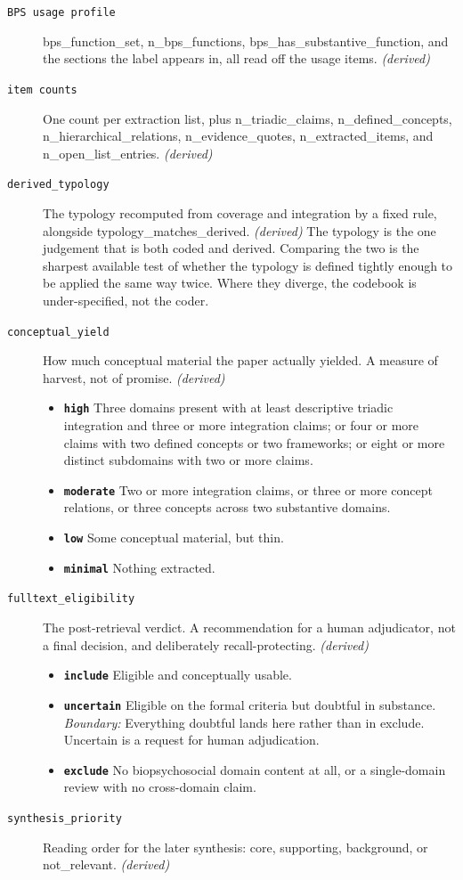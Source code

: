 \documentclass[11pt]{article}
\begin{document}
\begin{description}
\item[\texttt{BPS usage profile}] bps\_function\_set, n\_bps\_functions, bps\_has\_substantive\_function, and the sections the label appears in, all read off the usage items. \textit{(derived)}
\item[\texttt{item counts}] One count per extraction list, plus n\_triadic\_claims, n\_defined\_concepts, n\_hierarchical\_relations, n\_evidence\_quotes, n\_extracted\_items, and n\_open\_list\_entries. \textit{(derived)}
\item[\texttt{derived\_typology}] The typology recomputed from coverage and integration by a fixed rule, alongside typology\_matches\_derived. \textit{(derived)}
{\small The typology is the one judgement that is both coded and derived. Comparing the two is the sharpest available test of whether the typology is defined tightly enough to be applied the same way twice. Where they diverge, the codebook is under-specified, not the coder.}
\item[\texttt{conceptual\_yield}] How much conceptual material the paper actually yielded. A measure of harvest, not of promise. \textit{(derived)}
  \begin{itemize}[leftmargin=1.3em,itemsep=2pt,topsep=2pt]
  \item \textbf{\texttt{high}} Three domains present with at least descriptive triadic integration and three or more integration claims; or four or more claims with two defined concepts or two frameworks; or eight or more distinct subdomains with two or more claims.
  \item \textbf{\texttt{moderate}} Two or more integration claims, or three or more concept relations, or three concepts across two substantive domains.
  \item \textbf{\texttt{low}} Some conceptual material, but thin.
  \item \textbf{\texttt{minimal}} Nothing extracted.
  \end{itemize}
\item[\texttt{fulltext\_eligibility}] The post-retrieval verdict. A recommendation for a human adjudicator, not a final decision, and deliberately recall-protecting. \textit{(derived)}
  \begin{itemize}[leftmargin=1.3em,itemsep=2pt,topsep=2pt]
  \item \textbf{\texttt{include}} Eligible and conceptually usable.
  \item \textbf{\texttt{uncertain}} Eligible on the formal criteria but doubtful in substance. {\small \textit{Boundary:} Everything doubtful lands here rather than in exclude. Uncertain is a request for human adjudication.}
  \item \textbf{\texttt{exclude}} No biopsychosocial domain content at all, or a single-domain review with no cross-domain claim.
  \end{itemize}
\item[\texttt{synthesis\_priority}] Reading order for the later synthesis: core, supporting, background, or not\_relevant. \textit{(derived)}
\end{description}
\end{document}
